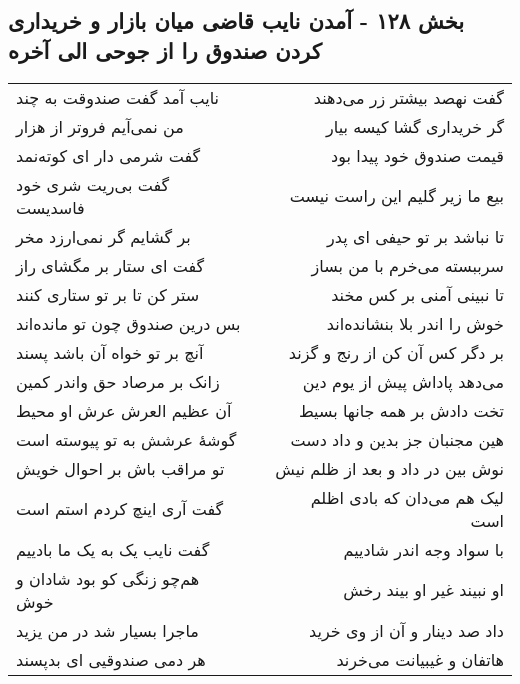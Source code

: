 \begin{center}
\section*{بخش ۱۲۸ - آمدن نایب قاضی میان بازار و خریداری کردن صندوق را از جوحی الی آخره}
\label{sec:sh128}
\begin{longtable}{l p{0.5cm} r}
نایب آمد گفت صندوقت به چند
&&
گفت نهصد بیشتر زر می‌دهند
\\
من نمی‌آیم فروتر از هزار
&&
گر خریداری گشا کیسه بیار
\\
گفت شرمی دار ای کوته‌نمد
&&
قیمت صندوق خود پیدا بود
\\
گفت بی‌ریت شری خود فاسدیست
&&
بیع ما زیر گلیم این راست نیست
\\
بر گشایم گر نمی‌ارزد مخر
&&
تا نباشد بر تو حیفی ای پدر
\\
گفت ای ستار بر مگشای راز
&&
سرببسته می‌خرم با من بساز
\\
ستر کن تا بر تو ستاری کنند
&&
تا نبینی آمنی بر کس مخند
\\
بس درین صندوق چون تو مانده‌اند
&&
خوش را اندر بلا بنشانده‌اند
\\
آنچ بر تو خواه آن باشد پسند
&&
بر دگر کس آن کن از رنج و گزند
\\
زانک بر مرصاد حق واندر کمین
&&
می‌دهد پاداش پیش از یوم دین
\\
آن عظیم العرش عرش او محیط
&&
تخت دادش بر همه جانها بسیط
\\
گوشهٔ عرشش به تو پیوسته است
&&
هین مجنبان جز بدین و داد دست
\\
تو مراقب باش بر احوال خویش
&&
نوش بین در داد و بعد از ظلم نیش
\\
گفت آری اینچ کردم استم است
&&
لیک هم می‌دان که بادی اظلم است
\\
گفت نایب یک به یک ما بادییم
&&
با سواد وجه اندر شادییم
\\
هم‌چو زنگی کو بود شادان و خوش
&&
او نبیند غیر او بیند رخش
\\
ماجرا بسیار شد در من یزید
&&
داد صد دینار و آن از وی خرید
\\
هر دمی صندوقیی ای بدپسند
&&
هاتفان و غیبیانت می‌خرند
\\
\end{longtable}
\end{center}
